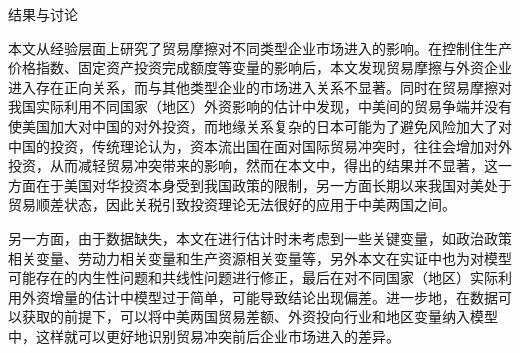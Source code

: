\documentclass[]{article}
\begin{document}
结果与讨论

本文从经验层面上研究了贸易摩擦对不同类型企业市场进入的影响。在控制住生产价格指数、固定资产投资完成额度等变量的影响后，本文发现贸易摩擦与外资企业进入存在正向关系，而与其他类型企业的市场进入关系不显著。同时在贸易摩擦对我国实际利用不同国家（地区）外资影响的估计中发现，中美间的贸易争端并没有使美国加大对中国的对外投资，而地缘关系复杂的日本可能为了避免风险加大了对中国的投资，传统理论认为，资本流出国在面对国际贸易冲突时，往往会增加对外投资，从而减轻贸易冲突带来的影响，然而在本文中，得出的结果并不显著，这一方面在于美国对华投资本身受到我国政策的限制，另一方面长期以来我国对美处于贸易顺差状态，因此关税引致投资理论无法很好的应用于中美两国之间。

另一方面，由于数据缺失，本文在进行估计时未考虑到一些关键变量，如政治政策相关变量、劳动力相关变量和生产资源相关变量等，另外本文在实证中也为对模型可能存在的内生性问题和共线性问题进行修正，最后在对不同国家（地区）实际利用外资增量的估计中模型过于简单，可能导致结论出现偏差。进一步地，在数据可以获取的前提下，可以将中美两国贸易差额、外资投向行业和地区变量纳入模型中，这样就可以更好地识别贸易冲突前后企业市场进入的差异。
\end{document}
